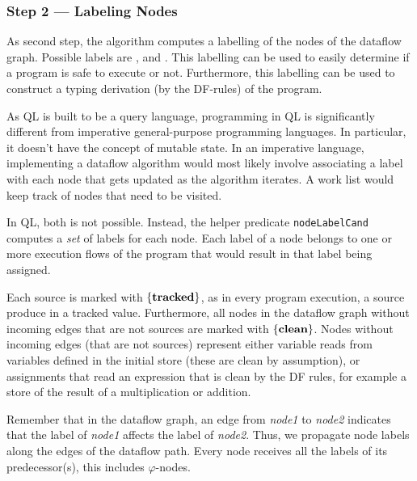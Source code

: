 \subsubsection*{Step 2 --- Labeling Nodes}
\newcommand{\coloredset}[1]{{\color{red}$\{#1\}$}}
\newcommand{\setclean}{\coloredset{\labclean}}
\newcommand{\settracked}{\coloredset{\labtracked}}
\newcommand{\setboth}{\coloredset{\labclean, \labtracked}}
\newcommand{\clclean}{:\ {\color{red}$\lclean$}}
\newcommand{\cltracked}{:\ {\color{red}$\ltracked$}}
\newcommand{\clunknown}{:\ {\color{red}$\lunknown$}}

As second step, the algorithm computes a labelling of the nodes of the dataflow graph.
Possible labels are \labclean, \labtracked and \labunknown.
This labelling can be used to easily determine if a program is safe to execute or not.
Furthermore, this labelling can be used to construct a typing derivation (by the DF-rules)
of the program.

As QL is built to be a query language, programming in QL is significantly different
from imperative general-purpose programming languages.
In particular, it doesn't have the concept of mutable state.
In an imperative language, implementing a dataflow algorithm would most
likely involve associating a label with each node that gets updated as the 
algorithm iterates.
A work list would keep track of nodes that need to be visited.

In QL, both is not possible.
Instead, the helper predicate \texttt{nodeLabelCand} computes a \emph{set} of
labels for each node.
Each label of a node belongs to one or more execution flows of the program 
that would result in that label being assigned.

Each source is marked with $\{\textbf{tracked}\}$, as in every program execution,
a source produce in a tracked value.
Furthermore, all nodes in the dataflow graph without
incoming edges that are not sources are marked with $\{\textbf{clean}\}$.
Nodes without incoming edges (that are not sources) represent either variable reads 
from variables defined in the initial store (these are clean by assumption), or 
assignments that read an expression that is clean by the DF rules, for example
a store of the result of a multiplication or addition.

Remember that in the dataflow graph, an edge from \textit{node1} to \textit{node2}
indicates that the label of \textit{node1} affects the label of \textit{node2}.
Thus, we propagate node labels along the edges of the dataflow path.
Every node receives all the labels of its predecessor(s), this includes
$\varphi$-nodes.

